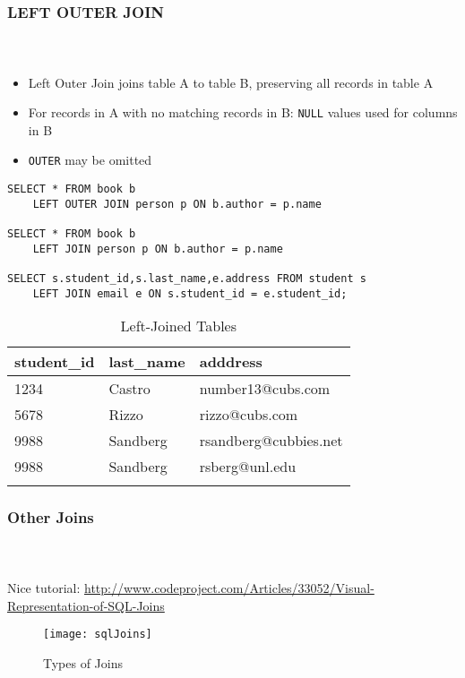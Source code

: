 \documentclass{beamer}
\begin{document}
\begin{frame}
  \frametitle{LEFT OUTER JOIN}
  \framesubtitle{~}

\begin{itemize}
  \item Left Outer Join joins table A to table B, preserving all records in table A
  \item For records in A with no matching records in B: \texttt{NULL} values used for columns in B
  \item \texttt{OUTER} may be omitted
\end{itemize}

\framebreak

\begin{verbatim}
SELECT * FROM book b
    LEFT OUTER JOIN person p ON b.author = p.name

SELECT * FROM book b
    LEFT JOIN person p ON b.author = p.name

SELECT s.student_id,s.last_name,e.address FROM student s
    LEFT JOIN email e ON s.student_id = e.student_id;
\end{verbatim}

\framebreak

\begin{table}
\centering
{\scriptsize
\begin{tabular}{|l|l|l|}
\hline
student\_id & last\_name & adddress \\
\hline
\hline
1234 & Castro & number13@cubs.com \\
5678 & Rizzo & rizzo@cubs.com\\
9988 & Sandberg & rsandberg@cubbies.net \\
9988 & Sandberg &  rsberg@unl.edu \\
\color{blue}{1122} & \color{blue}{Sveum} & \color{blue}{NULL} \\
\hline 
\end{tabular}
}
\caption{Left-Joined Tables}
\end{table}


\end{frame}

\begin{frame}
  \frametitle{Other Joins}
  \framesubtitle{~}
  
  {\tiny Nice tutorial: \url{http://www.codeproject.com/Articles/33052/Visual-Representation-of-SQL-Joins} } 
  \begin{figure}[h]
    \texttt{[image: sqlJoins]}
    \caption{Types of Joins}
  \end{figure}

\end{frame}
\end{document}
